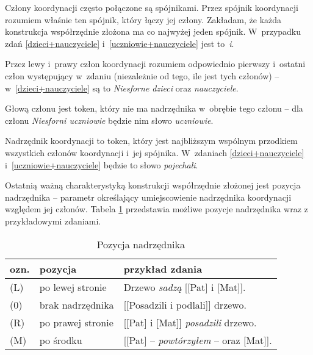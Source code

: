 \begin{exe}
\ex \label{uczniowie+nauczyciele-UD}
\end{exe}

Człony koordynacji często połączone są spójnikami. Przez spójnik koordynacji rozumiem właśnie ten spójnik, który łączy jej człony. Zakładam, że każda konstrukcja współrzędnie złożona ma co najwyżej jeden spójnik. W~przypadku zdań \eqref{dzieci+nauczyciele} i~\eqref{uczniowie+nauczyciele} jest to~\emph{i}.

Przez lewy i~prawy człon koordynacji rozumiem odpowiednio pierwszy i~ostatni człon występujący w~zdaniu (niezależnie od tego, ile jest tych członów) -- w~\eqref{dzieci+nauczyciele} są to \emph{Niesforne dzieci} oraz \emph{nauczyciele}.

Głową członu jest token, który nie ma nadrzędnika w~obrębie tego członu -- dla członu \emph{Niesforni uczniowie} będzie nim słowo \emph{uczniowie}.

Nadrzędnik koordynacji to token, który jest najbliższym wspólnym przodkiem wszystkich członów koordynacji i~jej spójnika. W~zdaniach \eqref{dzieci+nauczyciele} i~\eqref{uczniowie+nauczyciele} będzie to słowo \emph{pojechali}.

Ostatnią ważną charakterystyką konstrukcji współrzędnie złożonej jest pozycja nadrzędnika -- parametr określający umiejscowienie nadrzędnika koordynacji względem jej członów. Tabela \ref{pozycja-nadrzędnika} przedstawia możliwe pozycje nadrzędnika wraz z przykładowymi zdaniami.

\begin{table}[!h]
\centering
\begin{tabular}{l l l}
\toprule
ozn.	& pozycja			& przykład zdania								\\
\midrule
(L) & po lewej stronie	& Drzewo \textit{sadzą} [[Pat] i [Mat]].		\\
(0) & brak nadrzędnika	& [[Posadzili i podlali]] drzewo.				\\
(R) & po prawej stronie	& [[Pat] i [Mat]] \textit{posadzili} drzewo. 			\\
(M) & po środku			& [[Pat] -- \textit{powtórzyłem} -- oraz [Mat]].	\\
\bottomrule
\end{tabular}
\caption{Pozycja nadrzędnika}
\label{pozycja-nadrzędnika}
\end{table}

